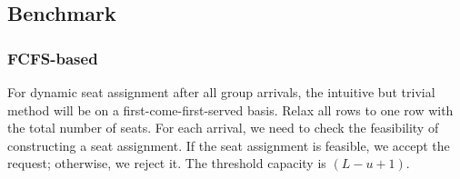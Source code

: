 





\subsection{Benchmark}
 

\subsubsection{FCFS-based}\label{FCFS-based}

For dynamic seat assignment after all group arrivals, the intuitive but trivial method will be on a first-come-first-served basis. Relax all rows to one row with the total number of seats. For each arrival, we need to check the feasibility of constructing a seat assignment. If the seat assignment is feasible, we accept the request; otherwise, we reject it. The threshold capacity is $(L -u +1)$.







